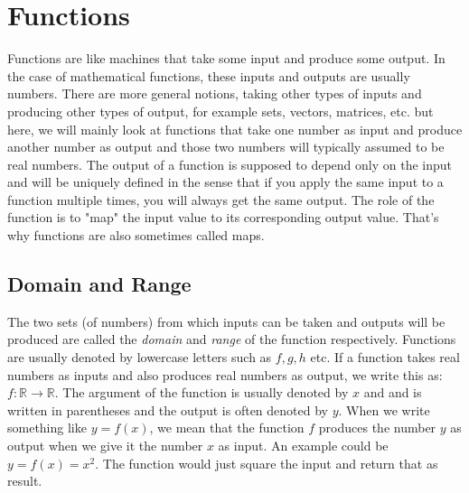\section{Functions}
Functions are like machines that take some input and produce some output. In the case of mathematical functions, these inputs and outputs are usually numbers. There are more general notions, taking other types of inputs and producing other types of output, for example sets, vectors, matrices, etc. but here, we will mainly look at functions that take one number as input and produce another number as output and those two numbers will typically assumed to be real numbers. The output of a function is supposed to depend only on the input and will be uniquely defined in the sense that if you apply the same input to a function multiple times, you will always get the same output. The role of the function is to "map" the input value to its corresponding output value. That's why functions are also sometimes called maps.



\subsection{Domain and Range}
The two sets (of numbers) from which inputs can be taken and outputs will be produced are called the \emph{domain} and \emph{range} of the function respectively. Functions are usually denoted by lowercase letters such as $f,g,h$ etc. If a function takes real numbers as inputs and also produces real numbers as output, we write this as: $f: \mathbb{R} \rightarrow \mathbb{R}$. The argument of the function is usually denoted by $x$ and and is written in parentheses and the output is often denoted by $y$. When we write something like $y = f(x)$, we mean that the function $f$ produces the number $y$ as output when we give it the number $x$ as input. An example could be $y = f(x) = x^2$. The function would just square the input and return that as result. 

